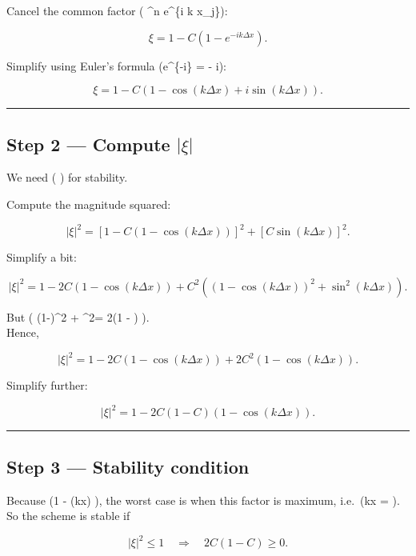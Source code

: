 \documentclass[
  letterpaper,
]{book}
\begin{document}
Cancel the common factor ( \xi\^{}n e\^{}\{i k x\_j\}):

\[
\xi = 1 - C(1 - e^{-i k \Delta x}).
\]

Simplify using Euler's formula (e\^{}\{-i\theta\} = \cos\theta -
i\sin\theta):

\[
\boxed{\displaystyle
\xi = 1 - C(1 - \cos(k\Delta x) + i\sin(k\Delta x)).
}
\]

\begin{center}\rule{0.5\linewidth}{0.5pt}\end{center}

\subsection{\texorpdfstring{Step 2 --- Compute
\(|\xi|\)}{Step 2 --- Compute \textbar\textbackslash xi\textbar{}}}\label{step-2-compute-xi}

We need ( \textbar{}\xi\textbar{}  ) for stability.

Compute the magnitude squared:

\[
|\xi|^2 = [1 - C(1 - \cos(k\Delta x))]^2 + [C\sin(k\Delta x)]^2.
\]

Simplify a bit:

\[
|\xi|^2 = 1 - 2C(1 - \cos(k\Delta x)) + C^2( (1 - \cos(k\Delta x))^2 + \sin^2(k\Delta x)).
\]

But ( (1-\cos\theta)\^{}2 + \sin\^{}2\theta = 2(1 - \cos\theta) ).\\
Hence,

\[
|\xi|^2 = 1 - 2C(1 - \cos(k\Delta x)) + 2C^2(1 - \cos(k\Delta x)).
\]

Simplify further:

\[
|\xi|^2 = 1 - 2C(1-C)(1 - \cos(k\Delta x)).
\]

\begin{center}\rule{0.5\linewidth}{0.5pt}\end{center}

\subsection{Step 3 --- Stability
condition}\label{step-3-stability-condition}

Because (1 - \cos(k\Delta x) ), the worst case is when this factor
is maximum, i.e.~(k\Delta x = \pi).\\
So the scheme is stable if

\[
|\xi|^2 \le 1 \quad \Rightarrow \quad 2C(1-C) \ge 0.
\]
\end{document}
